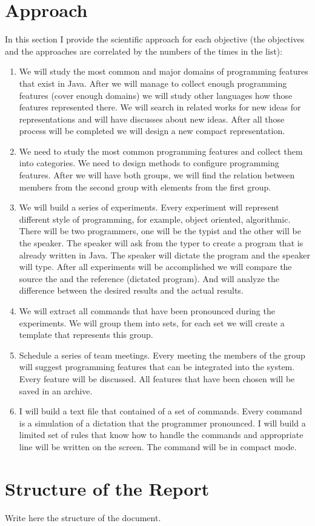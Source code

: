 \section{Approach}
In this section I provide the scientific approach for each objective (the objectives and the approaches are correlated by the numbers of the times in the list):
\begin{enumerate}
	\item We will study the most common and major domains of programming features that exist in Java. After we will manage to collect enough programming features (cover enough domains) we will study other languages how those features represented there. We will search in related works for new ideas for representations and will have discusses about new ideas. After all those process will be completed we will design a new compact representation.
	\item We need to study the most common programming features and collect them into categories. We need to design methods to configure programming features. After we will have both groups, we will find the relation between members from the second group with elements from the first group.
	\item We will build a series of experiments. Every experiment will represent different style of programming, for example, object oriented, algorithmic. There will be two programmers, one will be the typist and the other will be the speaker. The speaker will ask from the typer to create a program that is already written in Java. The speaker will dictate the program and the speaker will type. After all experiments will be accomplished we will compare the source the and the reference (dictated program). And will analyze the difference between the desired results and the actual results.
	\item We will extract all commands that have been pronounced during the experiments. We will group them into sets, for each set we will create a template that represents this group.
	\item Schedule a series of team meetings. Every meeting the members of the group will suggest programming features that can be integrated into the system. Every feature will be discussed. All features that have been chosen will be saved in an archive.
	\item I will build a text file that contained of a set of commands. Every command is a simulation of a dictation that the programmer pronounced. I will build a limited set of rules that know how to handle the commands and appropriate line will be written on the screen. The command will be in compact mode.
\end{enumerate}

\section{Structure of the Report}
\begin{remark}
Write here the structure of the document.
\end{remark}